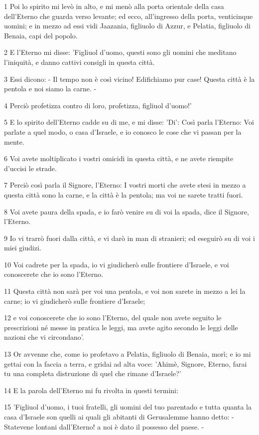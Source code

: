 \par 1 Poi lo spirito mi levò in alto, e mi menò alla porta orientale della casa dell'Eterno che guarda verso levante; ed ecco, all'ingresso della porta, venticinque uomini; e in mezzo ad essi vidi Jaazania, figliuolo di Azzur, e Pelatia, figliuolo di Benaia, capi del popolo.
\par 2 E l'Eterno mi disse: 'Figliuol d'uomo, questi sono gli uomini che meditano l'iniquità, e danno cattivi consigli in questa città.
\par 3 Essi dicono: - Il tempo non è così vicino! Edifichiamo pur case! Questa città è la pentola e noi siamo la carne. -
\par 4 Perciò profetizza contro di loro, profetizza, figliuol d'uomo!'
\par 5 E lo spirito dell'Eterno cadde su di me, e mi disse: 'Di': Così parla l'Eterno: Voi parlate a quel modo, o casa d'Israele, e io conosco le cose che vi passan per la mente.
\par 6 Voi avete moltiplicato i vostri omicidi in questa città, e ne avete riempite d'uccisi le strade.
\par 7 Perciò così parla il Signore, l'Eterno: I vostri morti che avete stesi in mezzo a questa città sono la carne, e la città è la pentola; ma voi ne sarete tratti fuori.
\par 8 Voi avete paura della spada, e io farò venire su di voi la spada, dice il Signore, l'Eterno.
\par 9 Io vi trarrò fuori dalla città, e vi darò in man di stranieri; ed eseguirò su di voi i miei giudizi.
\par 10 Voi cadrete per la spada, io vi giudicherò sulle frontiere d'Israele, e voi conoscerete che io sono l'Eterno.
\par 11 Questa città non sarà per voi una pentola, e voi non sarete in mezzo a lei la carne; io vi giudicherò sulle frontiere d'Israele;
\par 12 e voi conoscerete che io sono l'Eterno, del quale non avete seguito le prescrizioni né messe in pratica le leggi, ma avete agito secondo le leggi delle nazioni che vi circondano'.
\par 13 Or avvenne che, come io profetavo a Pelatia, figliuolo di Benaia, morì; e io mi gettai con la faccia a terra, e gridai ad alta voce: 'Ahimè, Signore, Eterno, farai tu una completa distruzione di quel che rimane d'Israele?'
\par 14 E la parola dell'Eterno mi fu rivolta in questi termini:
\par 15 'Figliuol d'uomo, i tuoi fratelli, gli uomini del tuo parentado e tutta quanta la casa d'Israele son quelli ai quali gli abitanti di Gerusalemme hanno detto: - Statevene lontani dall'Eterno! a noi è dato il possesso del paese. -
